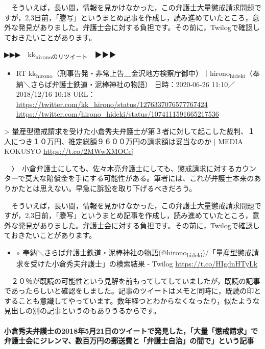 \documentclass[]{ltjarticle}
\let\oldparagraph\paragraph
\renewcommand{\paragraph}[1]{\oldparagraph{#1}\mbox{}}
\begin{document}
　そういえば，長い間，情報を見かけなかった，この弁護士大量懲戒請求問題ですが，2,3日前，「謄写」というまとめ記事を作成し，読み進めていたところ，意外な発見がありました。弁護士会に対する負担です。その前に，Twilogで確認しておきたいことがあります。

▶▶▶　kk\textsubscript{hironoのリツイート}　▶▶▶  

\begin{itemize}
\item RT kk\textsubscript{hirono}（刑事告発・非常上告＿金沢地方検察庁御中）｜hirono\textsubscript{hideki}（奉納＼さらば弁護士鉄道・泥棒神社の物語） 日時：2020-06-26 11:10／2018/12/16 10:18 URL： \url{https://twitter.com/kk\_hirono/status/1276337076577767424} \url{https://twitter.com/hirono\_hideki/status/1074111591665217536}
\end{itemize}

> 量産型懲戒請求を受けた小倉秀夫弁護士が第３者に対して起こした裁判、１人につき１０万円、推定総額９６００万円の請求額は妥当なのか | MEDIA　KOKUSYO \url{https://t.co/2MWwXMOCej}  

　〉　小倉弁護士にしても、佐々木亮弁護士にしても、懲戒請求に対するカウンターで莫大な賠償金を手にする可能性がある。筆者には、これが弁護士本来のありかたとは思えない。早急に訴訟を取り下げるべきだろう。

　そういえば，長い間，情報を見かけなかった，この弁護士大量懲戒請求問題ですが，2,3日前，「謄写」というまとめ記事を作成し，読み進めていたところ，意外な発見がありました。弁護士会に対する負担です。その前に，Twilogで確認しておきたいことがあります。

\begin{itemize}
\item » 奉納＼さらば弁護士鉄道・泥棒神社の物語(@hirono\textsubscript{hideki})/「量産型懲戒請求を受けた小倉秀夫弁護士」の検索結果 - Twilog \url{https://t.co/HIgdnHTyLk}
\end{itemize}

　２０％が既読の可能性という見解を前もってしてしていましたが，既読の記事であったらしいと確認をしました。記事のツイートはメモと同時に，既読の印とすることも意識してやっています。数年経つとわからなくなったり，似たような見出しの別の記事というのもありうるからです。

\paragraph{小倉秀夫弁護士の2018年5月21日のツイートで発見した，「大量「懲戒請求」で弁護士会にジレンマ、数百万円の郵送費と「弁護士自治」の間で」という記事}
\label{sec:org388d21a}
\end{document}
